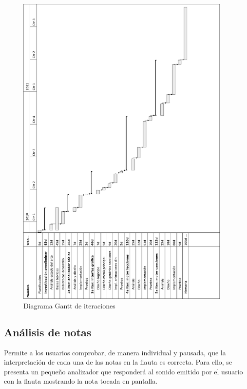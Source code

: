 \documentclass[a4paper,11pt]{article}
\begin{document}
\begin{figure}[htp!]
  \centering
  \includegraphics[width=0.95\textwidth]{imagen_diagrama_gantt}
  \caption{Diagrama Gantt de iteraciones}
  \label{fig:gantt}
\end{figure}

\pagebreak

\subsection{Análisis de notas}
Permite a los usuarios comprobar, de manera individual y pausada, que la
interpretación de cada una de las notas en la flauta es correcta. Para ello, se
presenta un pequeño analizador que responderá al sonido emitido por el usuario
con la flauta mostrando la nota tocada en pantalla.
\end{document}
